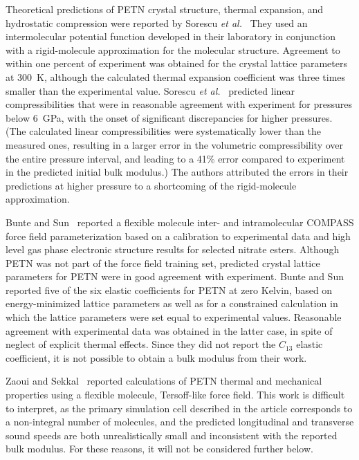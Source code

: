 \documentclass[prb,aps,nobibnotes,twocolumn,doublespace,twocolumngrid,superbib]{revtex4}
\begin{document}
Theoretical predictions of PETN crystal structure, thermal expansion,
and hydrostatic compression were reported by Sorescu {\it et
al.}~\cite{Sorescu_1999v103A, Sorescu_1999v103} They used an
intermolecular potential function developed in their laboratory
in conjunction with a rigid-molecule 
approximation for the molecular structure. Agreement to within one percent 
of experiment was obtained for the crystal lattice parameters at 300~K, although
the calculated thermal expansion coefficient was three times smaller than the
experimental value.  Sorescu {\it et al.}~\cite{Sorescu_1999v103}
predicted linear compressibilities that were in reasonable agreement
with experiment for pressures below 6~GPa, with the onset of
significant discrepancies for higher pressures.  (The calculated
linear compressibilities were systematically lower than the measured
ones, resulting in a larger error in the volumetric compressibility
over the entire pressure interval, and leading to a 41\% error
compared to experiment in the predicted initial bulk modulus.) The
authors attributed the errors in their predictions at higher pressure
to a shortcoming of the rigid-molecule approximation.

Bunte and Sun~\cite{Bunte_2000v104} reported a flexible molecule
inter- and intramolecular COMPASS force field parameterization based
on a calibration to experimental data and high level gas phase
electronic structure results for selected nitrate esters.  Although
PETN was not part of the force field training set, predicted crystal
lattice parameters for PETN were in good agreement with experiment.
Bunte and Sun reported five of the six elastic coefficients for PETN
at zero Kelvin, based on energy-minimized lattice parameters as well
as for a constrained calculation in which the lattice parameters were
set equal to experimental values.  Reasonable agreement with
experimental data was obtained in the latter case, in spite of neglect
of explicit thermal effects.  Since they did not report the $C_{13}$
elastic coefficient, it is not possible to obtain a bulk modulus from
their work.

Zaoui and Sekkal~\cite{Zaoui_2001v118} reported calculations of PETN
thermal and mechanical properties using a flexible molecule, Tersoff-like force
field.  This work is difficult to interpret, as the primary simulation
cell described in the article corresponds to a non-integral number of
molecules, and the predicted longitudinal and transverse sound speeds
are both unrealistically small and inconsistent with the reported bulk
modulus.  For these reasons, it will not be considered further below.
\end{document}

